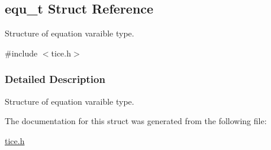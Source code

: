 \hypertarget{structequ__t}{}\subsection{equ\+\_\+t Struct Reference}
\label{structequ__t}


Structure of equation varaible type.  




{\ttfamily \#include $<$tice.\+h$>$}



\subsubsection{Detailed Description}
Structure of equation varaible type. 

The documentation for this struct was generated from the following file\+:\begin{DoxyCompactItemize}
\item 
\hyperlink{tice_8h}{tice.\+h}\end{DoxyCompactItemize}
